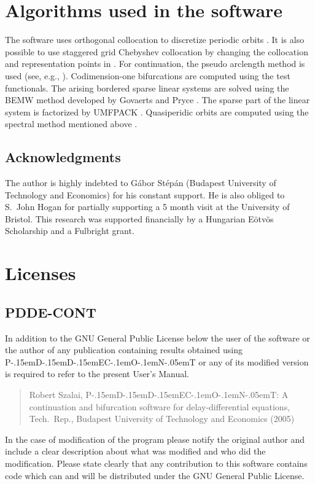 \documentclass[10pt,a4paper]{ddedoc}
\def\pdde{{P\kern-.15emD\kern-.15emD\kern-.15emE\raisebox{.25ex}{-}C\kern-.1emO\kern-.1emN\kern-.05emT}}
\begin{document}
\section{Algorithms used in the software}

The software uses orthogonal collocation to discretize periodic orbits
\cite{engstab,engcol}. It is also possible to use staggered grid Chebyshev
collocation \cite{kopriva} by changing the collocation and representation points
in . For continuation, the pseudo arclength method is
used (see, e.g., \cite{handbook, tutorial1, tutorial2}). Codimension-one
bifurcations are computed using the test functionals. The arising bordered
sparse linear systems are solved using the BEMW method developed by Govaerts and
Pryce \cite{Gov1993}. The sparse part of the linear system is factorized by
UMFPACK \cite{umfpack}. Quasiperidic orbits are computed using the spectral
method mentioned above \cite{kopriva}.

\subsection*{Acknowledgments}

The author is highly indebted to G\'abor St\'ep\'an (Budapest University of 
Technology and Economics) for his constant support. He is also
obliged to S.~John Hogan for partially supporting a 5 month visit at the
University of Bristol.
This research was supported financially by a Hungarian E\"otv\"os Scholarship
and a Fulbright grant.

\appendix

\section{Licenses}

\subsection{PDDE-CONT}

In addition to the GNU General Public License below the user of the software or
the author of any
publication containing results obtained using \pdde{} or any of its modified
version is required to refer to the present User's Manual.
\begin{quote}
Robert Szalai, \pdde{}: A continuation and bifurcation software for 
delay-differential equations, Tech.\ Rep., Budapest University of Technology
and Economics (2005)
\end{quote}
In the case of modification of the program please notify the original author and
include a clear description about what was modified and who did the 
modification. Please state clearly that any contribution to this software
contains code which can and will be distributed under the GNU General Public
License.
\end{document}
